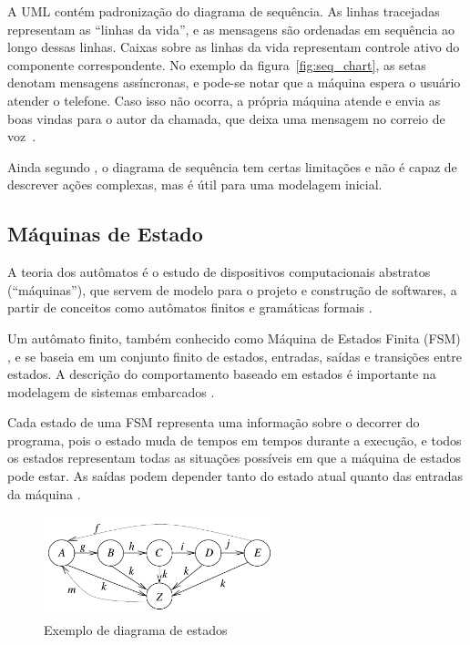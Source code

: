 A UML contém padronização do diagrama de sequência. As linhas tracejadas representam as ``linhas da vida'', e as mensagens são ordenadas em sequência ao longo dessas linhas. Caixas sobre as linhas da vida representam controle ativo do componente correspondente. No exemplo da figura~\ref{fig:seq_chart}, as setas denotam mensagens assíncronas, e pode-se notar que a máquina espera o usuário atender o telefone. Caso isso não ocorra, a própria máquina atende e envia as boas vindas para o autor da chamada, que deixa uma mensagem no correio de voz~\cite{marwedel:2010}.

Ainda segundo , o diagrama de sequência tem certas limitações e não é capaz de descrever ações complexas, mas é útil para uma modelagem inicial.

\subsection{Máquinas de Estado}

A teoria dos autômatos é o estudo de dispositivos computacionais abstratos (``máquinas''), que servem de modelo para o projeto e construção de softwares, a partir de conceitos como autômatos finitos e gramáticas formais \cite{hopcroft:2001}.

Um autômato finito, também conhecido como Máquina de Estados Finita (FSM) \cite{wagner:2006}, e se baseia em um conjunto finito de estados, entradas, saídas e transições entre estados. A descrição do comportamento baseado em estados é importante na modelagem de sistemas embarcados \cite{marwedel:2010}.

Cada estado de uma FSM representa uma informação sobre o decorrer do programa, pois o estado muda de tempos em tempos durante a execução, e todos os estados representam todas as situações possíveis em que a máquina de estados pode estar. As saídas podem depender tanto do estado atual quanto das entradas da máquina \cite{wagner:2006}.

\begin{figure}[ht]
	\caption{\label{fig:fsm}Exemplo de diagrama de estados}
	\begin{center}
	    \includegraphics[width=0.6\textwidth]{resources/fsm_marwedel}
	\end{center}
\end{figure}

